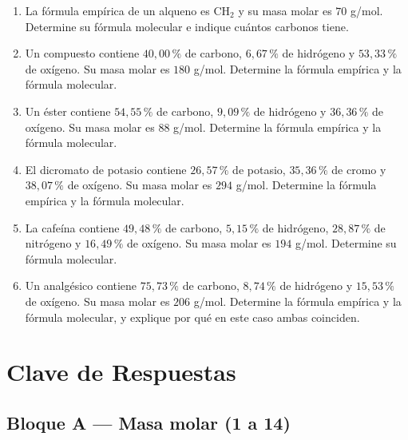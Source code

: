 \documentclass[12pt, letterpaper]{article}
\newcommand{\pc}{\text{\%}}
\begin{document}
\begin{enumerate}[leftmargin=*, start=48]
  \item \muyDificil{}\hspace{0.55em}La fórmula empírica de un alqueno es $\text{CH}_2$ y su masa molar es $70$ g/mol. Determine su fórmula molecular e indique cuántos carbonos tiene.

  \item \muyDificil{}\hspace{0.55em}Un compuesto contiene $40{,}00\,\pc$ de carbono, $6{,}67\,\pc$ de hidrógeno y $53{,}33\,\pc$ de oxígeno. Su masa molar es $180$ g/mol. Determine la fórmula empírica y la fórmula molecular.

  \item \muyDificil{}\hspace{0.55em}Un éster contiene $54{,}55\,\pc$ de carbono, $9{,}09\,\pc$ de hidrógeno y $36{,}36\,\pc$ de oxígeno. Su masa molar es $88$ g/mol. Determine la fórmula empírica y la fórmula molecular.

  \item \muyDificil{}\hspace{0.55em}El dicromato de potasio contiene $26{,}57\,\pc$ de potasio, $35{,}36\,\pc$ de cromo y $38{,}07\,\pc$ de oxígeno. Su masa molar es $294$ g/mol. Determine la fórmula empírica y la fórmula molecular.

  \item \muyDificil{}\hspace{0.55em}La cafeína contiene $49{,}48\,\pc$ de carbono, $5{,}15\,\pc$ de hidrógeno, $28{,}87\,\pc$ de nitrógeno y $16{,}49\,\pc$ de oxígeno. Su masa molar es $194$ g/mol. Determine su fórmula molecular.

  \item \muyDificil{}\hspace{0.55em}Un analgésico contiene $75{,}73\,\pc$ de carbono, $8{,}74\,\pc$ de hidrógeno y $15{,}53\,\pc$ de oxígeno. Su masa molar es $206$ g/mol. Determine la fórmula empírica y la fórmula molecular, y explique por qué en este caso ambas coinciden.

\end{enumerate}

\newpage
\ifmwclaves
  \section{Clave de Respuestas}

  \subsection*{Bloque A — Masa molar (1 a 14)}
\end{document}

